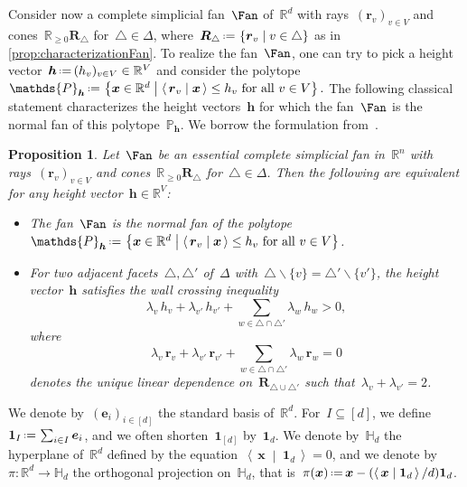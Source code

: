 \documentclass{amsart}
\newtheorem{proposition}[theorem]{Proposition}
\theoremstyle{definition}
\newcommand{\R}{\mathbb{R}} %
\newcommand{\HH}{\mathbb{H}} %
\renewcommand{\b}[1]{{\boldsymbol{#1}}} %
\newcommand{\set}[2]{\left\{ #1 \;\middle|\; #2 \right\}} %
\newcommand{\ssm}{\smallsetminus} %
\newcommand{\dotprod}[2]{\left\langle \, #1 \; \middle| \; #2 \, \right\rangle} %
\newcommand{\one}{\b{1}} %
\newcommand{\eqdef}{\mbox{\,\raisebox{0.2ex}{\scriptsize\ensuremath{\mathrm:}}\ensuremath{=}\,}} %
\newcommand{\darkblue}{\color{darkblue}} %
\newcommand{\defn}[1]{\textsl{\darkblue #1}} %
\newcommand{\polytope}[1]{\mathds{#1}} %
\begin{document}
\enlargethispage{.6cm}
Consider now a complete simplicial fan~$\Fan$ of~$\R^d$ with rays~$(\b{r}_v)_{v \in V}$ and cones~$\R_{\ge 0} \b{R}_\triangle$ for~${\triangle \in \Delta}$, where~$\b{R}_\triangle \eqdef \set{\b{r}_v}{v \in \triangle}$ as in \cref{prop:characterizationFan}.
To realize the fan~$\Fan$, one can try to pick a height vector~$\b{h} \eqdef (h_v)_{v \in V} \in \R^V$ and consider the polytope
\(
\polytope{P}_{\b{h}} \eqdef \set{\b{x} \in \R^d}{\dotprod{\b{r}_v}{\b{x}} \le h_v \text{ for all } v \in V}.
\)
The following classical statement characterizes the height vectors~$\b{h}$ for which the fan~$\Fan$ is the normal fan of this polytope~$\polytope{P}_{\b{h}}$.
We borrow the formulation from~\cite[Lem.~2.1]{ChapotonFominZelevinsky}.

\begin{proposition}
\label{prop:characterizationPolytopalFan}
Let~$\Fan$ be an essential complete simplicial fan in~$\R^n$ with rays~$(\b{r}_v)_{v \in V}$ and cones~$\R_{\ge 0} \b{R}_\triangle$ for~$\triangle \in \Delta$.
Then the following are equivalent for any height vector~$\b{h} \in \R^V$:
\begin{itemize}
\item The fan~$\Fan$ is the normal fan of the polytope~$\polytope{P}_{\b{h}} \eqdef \set{\b{x} \in \R^d}{\dotprod{\b{r}_v}{\b{x}} \le h_v \text{ for all } v \in V}$.
\item For two adjacent facets~$\triangle, \triangle'$ of~$\Delta$ with~$\triangle \ssm \{v\} = \triangle' \ssm \{v'\}$, the height vector~$\b{h}$ satisfies the \defn{wall crossing inequality}
\[
\lambda_v \, h_v + \lambda_{v'} \, h_{v'} + \sum_{w \in \triangle \cap \triangle'} \lambda_w \, h_w > 0,
\]
where
\[
\lambda_v \, \b{r}_v + \lambda_{v'} \, \b{r}_{v'} + \sum_{w \in \triangle \cap \triangle'} \lambda_w \, \b{r}_w = 0
\]
denotes the unique linear dependence on~$\b{R}_{\triangle \cup \triangle'}$ such that~$\lambda_v + \lambda_{v'} = 2$.
\end{itemize}
\end{proposition}

\pagebreak
We denote by~$(\b{e}_i)_{i \in [d]}$ the standard basis of~$\R^d$.
For~$I \subseteq [d]$, we define~$\one_I \eqdef \sum_{i \in I} \b{e}_i$, and we often shorten~$\one_{[d]}$ by~$\one_d$.
We denote by~$\HH_d$ the hyperplane of~$\R^d$ defined by the equation~$\dotprod{\b{x}}{\one_d} = 0$, and we denote by~$\pi : \R^d \to \HH_d$ the orthogonal projection on~$\HH_d$, that is~$\pi(\b{x}) \eqdef \b{x} - (\dotprod{\b{x}}{\one_d} / d) \one_d$.
\end{document}
